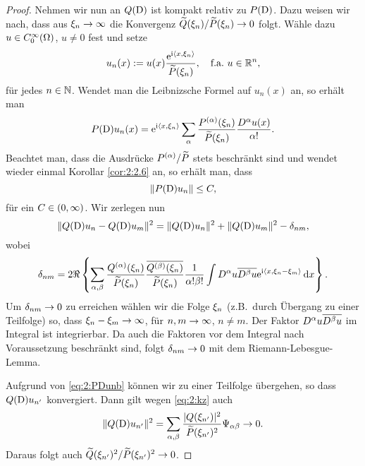 \begin{proof}
Nehmen wir nun an $Q(\mathrm D)$ ist kompakt relativ zu $P(\mathrm D)$.
Dazu weisen wir nach, dass aus $\xi_n\to\infty$ die Konvergenz $\widetilde{Q}(\xi_n)/\widetilde{P}(\xi_n)\to0$ folgt.
Wähle dazu $u\in C^\infty_0(\Omega)$, $u\neq0$ fest und setze
\begin{equation}
u_n(x):=u(x)\frac{\mathrm e^{\mathrm i\langle x,\xi_n\rangle}}{\widetilde{P}(\xi_n)},\quad\text{f.a.}~u\in\mathbb R^n,
\end{equation}
für jedes $n\in\mathbb N$.
Wendet man die Leibnizsche Formel auf $u_n(x)$ an,
so erhält man
\begin{equation}
P(\mathrm D)u_n(x)=\mathrm e^{\mathrm i\langle x,\xi_n\rangle}\sum_\alpha\frac{P^{(\alpha)}(\xi_n)}{\widetilde{P}(\xi_n)}\frac{D^\alpha u(x)}{\alpha!}.
\end{equation}
Beachtet man, dass die Ausdrücke $P^{(\alpha)}/\widetilde{P}$ stets beschränkt sind
und wendet wieder einmal Korollar \ref{cor:2:2.6} an,
so erhält man, dass
\begin{equation}\label{eq:2:PDunb}
\lVert P(\mathrm D)u_n\rVert\leq C,
\end{equation}
für ein $C\in(0,\infty)$.
Wir zerlegen nun
\begin{equation}\label{eq:2:kz}
\lVert Q(\mathrm D)u_n-Q(\mathrm D)u_m\rVert^2=\lVert Q(\mathrm D)u_n\rVert^2+\lVert Q(\mathrm D)u_m\rVert^2-\delta_{nm},
\end{equation}
wobei
\begin{equation}
\delta_{nm}=2\Re\left\{\sum_{\alpha,\beta}\frac{Q^{(\alpha)}(\xi_n)}{\widetilde{P}(\xi_n)}\frac{\overline{Q^{(\beta)}(\xi_n)}}{\widetilde{P}(\xi_n)}
\frac1{\alpha!\beta!}\int D^\alpha u\overline{D^\beta u}\mathrm e^{\mathrm i\langle x,\xi_n-\xi_m\rangle}\,\mathrm d x\right\}.
\end{equation}
Um $\delta_{nm}\to0$ zu erreichen wählen wir die Folge $\xi_n$ (z.B.~durch Übergang zu einer Teilfolge) so,
dass $\xi_n-\xi_m\to\infty$, für $n,m\to\infty$, $n\neq m$.
Der Faktor $D^\alpha u\overline{D^\beta u}$ im Integral ist integrierbar.
Da auch die Faktoren vor dem Integral nach Voraussetzung beschränkt sind,
folgt $\delta_{nm}\to0$ mit dem Riemann-Lebesgue-Lemma.

Aufgrund von \eqref{eq:2:PDunb} können wir zu einer Teilfolge übergehen,
so dass $Q(\mathrm D)u_{n^\prime}$ konvergiert.
Dann gilt wegen \eqref{eq:2:kz} auch
\begin{equation}
\lVert Q(\mathrm D)u_{n^\prime}\rVert^2=\sum_{\alpha,\beta}\frac{\lvert Q(\xi_{n^\prime})\rvert^2}{\widetilde{P}(\xi_{n^\prime})^2}\Psi_{\alpha\beta}\to0.
\end{equation}
Daraus folgt auch $\widetilde{Q}(\xi_{n^\prime})^2/\widetilde{P}(\xi_{n^\prime})^2\to0$.
\end{proof}
